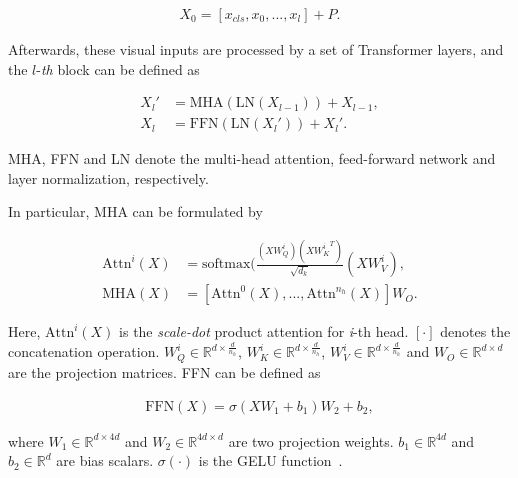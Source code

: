 \begin{equation}
\label{equ:trans_patch}
\begin{aligned}
X_0=[x_{cls},x_0,...,x_l]+P.
\end{aligned}
\end{equation}

Afterwards, these visual inputs are processed by a set of Transformer layers, and the $l$-\textit{th} block  can be defined as

\begin{equation}
\label{equ:trans_block}
\begin{aligned}
X_l'&=\text{MHA}(\text{LN}(X_{l-1}))+X_{l-1},\\
X_l&=\text{FFN}(\text{LN}(X_l'))+X_l'.
\end{aligned}
\end{equation}

MHA, FFN and LN denote the multi-head attention,  feed-forward network and layer normalization, respectively.

In particular,  MHA can be formulated by

\begin{equation}
\label{equ:trans_attn}
\begin{aligned}
\text{Attn}^i(X)&=\text{softmax}(\frac{(XW_{Q}^i)({XW_{K}^i}^T)}{\sqrt{d_k}}(XW_V^i),\\
\text{MHA}(X)&=[\text{Attn}^0(X),...,\text{Attn}^{n_h}(X)]W_O.
\end{aligned}
\end{equation}

Here, $\text{Attn}^i(X)$  is  the \textit{scale-dot}  product  attention for \textit{i}-th head. $[\cdot]$ denotes the concatenation operation. $W_{Q}^i \in \mathbb{R}^{d \times \frac{d}{n_h}}$,  $W_{K}^i  \in \mathbb{R}^{d \times \frac{d}{n_h}}$, $W_{V}^i  \in \mathbb{R}^{d \times \frac{d}{n_h}}$  and $W_O \in \mathbb{R}^{d\times d}$ are the projection  matrices.    FFN can be defined  as

\begin{equation}
\label{equ:trans_ffn}
\begin{aligned}
\text{FFN}(X)=\sigma(XW_1+b_1)W_2+b_2, 
\end{aligned}
\end{equation}

where  $W_1 \in \mathbb{R}^{d\times 4d}$ and  $W_2 \in \mathbb{R}^{4d\times d}$ are two projection weights. $b_1 \in \mathbb{R}^{4d}$ and $b_2 \in \mathbb{R}^{d}$ are bias scalars. $\sigma(\cdot)$ is the  GELU  function~\cite{bert}.

